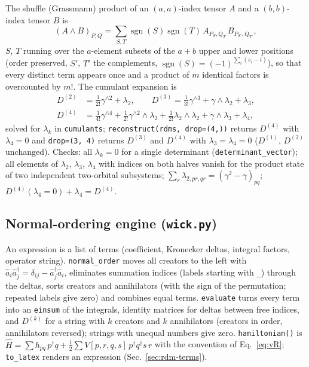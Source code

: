 \documentclass[11pt,a4paper]{article}
\newcommand{\code}[1]{\texttt{#1}}
\begin{document}
The shuffle (Grassmann) product of an $(a,a)$-index tensor $A$ and a
$(b,b)$-index tensor $B$ is
\begin{equation}
  (A\wedge B)_{P,Q}=\sum_{S,T}\operatorname{sgn}(S)\operatorname{sgn}(T)\,A_{P_S,Q_T}\,B_{P_{S'},Q_{T'}},
  \label{eq:wedge}
\end{equation}
$S$, $T$ running over the $a$-element subsets of the $a+b$ upper and lower
positions (order preserved, $S'$, $T'$ the complements,
$\operatorname{sgn}(S)=(-1)^{\sum_i(s_i-i)}$), so that every distinct term
appears once and a product of $m$ identical factors is overcounted by $m!$.
The cumulant expansion is
\begin{align}
  D^{(2)}&=\tfrac1{2!}\gamma^{\wedge2}+\lambda_2,\qquad
  D^{(3)}=\tfrac1{3!}\gamma^{\wedge3}+\gamma\wedge\lambda_2+\lambda_3,
  \nonumber\\
  D^{(4)}&=\tfrac1{4!}\gamma^{\wedge4}+\tfrac1{2!}\gamma^{\wedge2}\wedge\lambda_2
  +\tfrac1{2!}\lambda_2\wedge\lambda_2+\gamma\wedge\lambda_3+\lambda_4 ,
  \label{eq:cumulants}
\end{align}
solved for $\lambda_k$ in \code{cumulants}; \code{reconstruct(rdms, drop=(4,))}
returns $D^{(4)}$ with $\lambda_4=0$ and \code{drop=(3, 4)} returns $D^{(3)}$
and $D^{(4)}$ with $\lambda_3=\lambda_4=0$ ($D^{(1)}$, $D^{(2)}$ unchanged).
Checks: all $\lambda_k=0$ for a single determinant (\code{determinant\_vector});
all elements of $\lambda_2$, $\lambda_3$, $\lambda_4$ with indices on both
halves vanish for the product state of two independent two-orbital
subsystems; $\sum_r\lambda_{2,pr,qr}=(\gamma^2-\gamma)_{pq}$;
$D^{(4)}(\lambda_4=0)+\lambda_4=D^{(4)}$.

\subsection{Normal-ordering engine (\code{wick.py})}

An expression is a list of terms (coefficient, Kronecker deltas, integral
factors, operator string).  \code{normal\_order} moves all creators to the
left with $\hat a_i\hat a_j^\dagger=\delta_{ij}-\hat a_j^\dagger\hat a_i$,
eliminates summation indices (labels starting with \code{\_}) through the
deltas, sorts creators and annihilators (with the sign of the permutation;
repeated labels give zero) and combines equal terms.  \code{evaluate} turns
every term into an \code{einsum} of the integrals, identity matrices for
deltas between free indices, and $D^{(k)}$ for a string with $k$ creators
and $k$ annihilators (creators in order, annihilators reversed); strings
with unequal numbers give zero.  \code{hamiltonian()} is
$\hat H=\sum h_{pq}\,p^\dagger q+\tfrac12\sum V[p,r,q,s]\,p^\dagger q^\dagger s\,r$
with the convention of Eq.~\eqref{eq:vR}; \code{to\_latex} renders an
expression (Sec.~\ref{sec:rdm-terms}).
\end{document}
